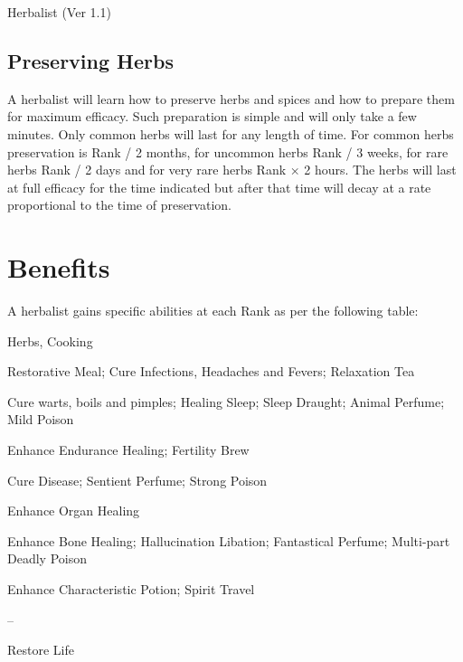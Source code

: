 \begin{Chapter}{Herbalist (Ver 1.1)}
\subsection{Preserving Herbs}

A herbalist will learn how to preserve herbs and spices and how to
prepare them for maximum efficacy.  Such preparation is simple and
will only take a few minutes.  Only common herbs will last for any
length of time.  For common herbs preservation is Rank / 2 months, for
uncommon herbs Rank / 3 weeks, for rare herbs Rank / 2 days and for
very rare herbs Rank × 2 hours.  The herbs will last at full efficacy
for the time indicated but after that time will decay at a rate
proportional to the time of preservation.

\section{Benefits}

A herbalist gains specific abilities at each Rank as per the following
table:

\begin{Enumerate}\setcounter{enumi}{-1}
\item Herbs, Cooking

\item Restorative Meal; Cure Infections, Headaches and Fevers;
  Relaxation Tea

\item Cure warts, boils and pimples; Healing Sleep; Sleep Draught;
  Animal Perfume; Mild Poison

\item Enhance Endurance Healing; Fertility Brew

\item Cure Disease;
  Sentient Perfume; Strong Poison 

\item Enhance Organ Healing

\item Enhance Bone Healing; Hallucination Libation; Fantastical
  Perfume; Multi-part Deadly Poison

\item Enhance Characteristic Potion; Spirit Travel

\item – 

\item Restore Life

\end{Enumerate}


\end{Chapter}
